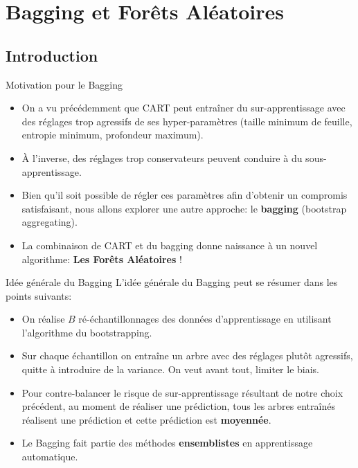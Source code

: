 \section[Bagging et Forêts Aléatoires]{Bagging et Forêts Aléatoires}

\subsection[Introduction]{Introduction}

\begin{frame}{Motivation pour le Bagging}
	\begin{itemize}
		\item On a vu précédemment que CART peut entraîner du sur-apprentissage avec des réglages trop agressifs de ses hyper-paramètres (taille minimum de feuille, entropie minimum, profondeur maximum).
		\item \`A l'inverse, des réglages trop conservateurs peuvent conduire à du sous-apprentissage.
		\item Bien qu'il soit possible de régler ces paramètres afin d'obtenir un compromis satisfaisant, nous allons explorer une autre approche: le \textbf{bagging} (bootstrap aggregating).
		\item La combinaison de CART et du bagging donne naissance à un nouvel algorithme: \textbf{Les Forêts Aléatoires} !
	\end{itemize}
\end{frame}

\begin{frame}{Idée générale du Bagging}
	L'idée générale du Bagging peut se résumer dans les points suivants:
	\begin{itemize}
		\item On réalise $B$ ré-échantillonnages des données d'apprentissage en utilisant l'algorithme du bootstrapping.
		\pause
		\item Sur chaque échantillon on entraîne un arbre avec des réglages plutôt agressifs, quitte à introduire de la variance. On veut avant tout, limiter le biais.
		\pause
		\item Pour contre-balancer le risque de sur-apprentissage résultant de notre choix précédent, au moment de réaliser une prédiction, tous les arbres entraînés réalisent une prédiction et cette prédiction est \textbf{moyennée}.
		\pause
		\item Le Bagging fait partie des méthodes \textbf{ensemblistes} en apprentissage automatique.
	\end{itemize}
\end{frame}

